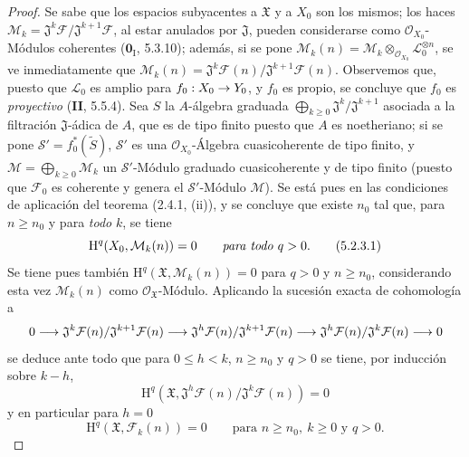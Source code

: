 \documentclass[10pt,oneside,openany]{book}
\theoremstyle{egaenv}\newtheorem*{env}{---}
\theoremstyle{egastatement}
\theoremstyle{egadescription}
\newcommand{\oldpage}[2][]{\marginnote{\normalfont\scriptsize\textbf{#1}\,|\,#2}\ignorespaces}
\renewcommand{\leq}{\leqslant}
\renewcommand{\geq}{\geqslant}
\renewcommand{\to}{\mathchoice{\longrightarrow}{\rightarrow}{\rightarrow}{\rightarrow}}
\begin{document}
\begin{proof}
Se sabe que los espacios subyacentes a $\mathfrak X$ y a $X_0$ son los mismos;
los haces
$\mathcal M_k=\mathfrak J^k\mathcal F/\mathfrak J^{k+1}\mathcal F$,
al estar anulados por $\mathfrak J$, pueden considerarse como
$\mathcal O_{X_0}$-Módulos coherentes ($\mathbf{0}_{\mathrm I}$, 5.3.10); además, si se
pone $\mathcal M_k(n)=\mathcal M_k\otimes_{\mathcal O_{X_0}}
\mathcal L_0^{\otimes n}$, se ve inmediatamente que
$\mathcal M_k(n)=\mathfrak J^k\mathcal F(n)/
\mathfrak J^{k+1}\mathcal F(n)$.
Observemos que, puesto que $\mathcal L_0$ es amplio para $f_0:X_0\to Y_0$, y
\oldpage[III]{152}
$f_0$ es propio, se concluye que $f_0$ es \emph{proyectivo} (\textbf{II}, 5.5.4). Sea $S$ la $A$-álgebra
graduada $\bigoplus_{k\geq0}\mathfrak J^k/\mathfrak J^{k+1}$ asociada a la filtración $\mathfrak J$-ádica de $A$, que es
de tipo finito puesto que $A$ es noetheriano; si se pone
$\mathcal S'=f_0^*(\widetilde S)$,
$\mathcal S'$ es una
$\mathcal O_{X_0}$-Álgebra cuasicoherente de tipo finito, y
$\mathcal M=\bigoplus_{k\geq0}\mathcal M_k$ un
$\mathcal S'$-Módulo graduado cuasicoherente y de tipo finito (puesto que $\mathcal F_0$
es coherente y genera el $\mathcal S'$-Módulo $\mathcal M$). Se está pues en las
condiciones de aplicación del teorema (2.4.1, (ii)), y se concluye que existe
$n_0$ tal que, para $n\geq n_0$ y para \emph{todo} $k$, se tiene
\begin{equation}
\mathrm H^q(X_0,\mathcal M_k(n))=0\qquad\text{\emph{para todo} }q>0.
\tag{5.2.3.1}
\label{III.5.2.3.1-fr}
\end{equation}
Se tiene pues también $\mathrm H^q(\mathfrak X,\mathcal M_k(n))=0$ para $q>0$ y
$n\geq n_0$, considerando esta vez $\mathcal M_k(n)$ como
$\mathcal O_{\mathfrak X}$-Módulo. Aplicando la sucesión exacta de cohomología a
\[
0\to
\mathfrak J^k\mathcal F(n)/\mathfrak J^{k+1}\mathcal F(n)
\to
\mathfrak J^h\mathcal F(n)/\mathfrak J^{k+1}\mathcal F(n)
\to
\mathfrak J^h\mathcal F(n)/\mathfrak J^k\mathcal F(n)
\to0
\]
se deduce ante todo que para $0\leq h<k$, $n\geq n_0$ y $q>0$ se tiene, por
inducción sobre $k-h$,
\begin{equation}
\mathrm H^q(\mathfrak X,
\mathfrak J^h\mathcal F(n)/\mathfrak J^k\mathcal F(n))=0
\tag{5.2.3.2}
\label{III.5.2.3.2-fr}
\end{equation}
y en particular para $h=0$
\begin{equation}
\mathrm H^q(\mathfrak X,\mathcal F_k(n))=0
\qquad\text{para }n\geq n_0,\ k\geq0\text{ y }q>0.
\tag{5.2.3.3}
\label{III.5.2.3.3-fr}
\end{equation}

\end{proof}
\end{document}
